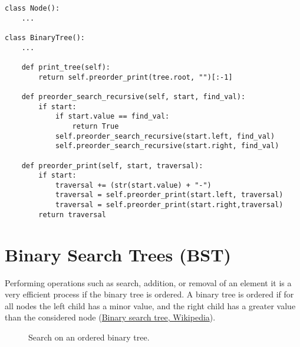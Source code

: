 \begin{lstlisting}[firstnumber=1, caption={Recursive pre-order traversal and search implementation.}]
class Node():
	...

class BinaryTree():
	...

	def print_tree(self):
		return self.preorder_print(tree.root, "")[:-1]

	def preorder_search_recursive(self, start, find_val):
		if start:
			if start.value == find_val:
				return True
			self.preorder_search_recursive(start.left, find_val)
			self.preorder_search_recursive(start.right, find_val)	
	
	def preorder_print(self, start, traversal):
		if start:
			traversal += (str(start.value) + "-")
			traversal = self.preorder_print(start.left, traversal)
			traversal = self.preorder_print(start.right,traversal)
		return traversal
\end{lstlisting}

\section{Binary Search Trees (BST)}
Performing operations such as search, addition, or removal of an element it is a very efficient process if the binary tree is ordered. A binary tree is ordered if for all nodes the left child has a minor value, and the right child has a greater value than the considered node \cite{wikibinsearchtree}(\href{https://en.wikipedia.org/wiki/Binary_search_tree}{Binary search tree, Wikipedia}).

\begin{figure}[H]
\centering
{}
\caption[Search on an ordered binary tree.]{Search on an ordered binary tree.}
\label{trees_13}
\end{figure}

